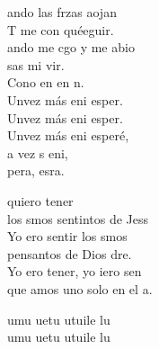 \documentclass[12pt]{article}
\begin{document}
\begin{multicols*}{2}
\begin{cancion}%
	ando las frzas aojan\\
	T me con quéeguir. \\
	ando me cgo y me abio \\
	 sas mi vir. \\
	Cono en en n. \\
	Unvez más eni esper.\\
	Unvez más eni esper.\\
	Unvez más eni esperé,\\
	a vez s eni, \\
	 pera,  esra.  \\
\end{cancion}%

\begin{cancion}%
	 quiero tener\\
	los smos sentintos de Jess\\
	Yo ero sentir los smos\\
	pensantos de Dios dre.\\
	Yo ero tener, yo iero sen\\
	que amos uno solo en el a.\\
\end{cancion}%

\begin{cancion}[Utufuile][]%
	umu uetu utuile lu\\
	umu uetu utuile lu\\
\end{cancion}%


\end{multicols*}
\end{document}
